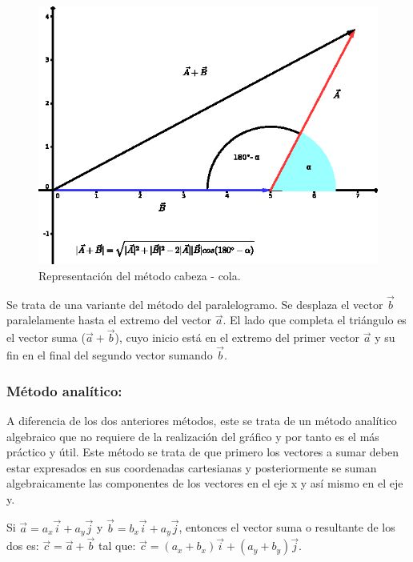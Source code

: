 \begin{figure}[H]
 \includegraphics[scale=1.1]{images/vector_seis.eps}
    \caption{\small{Representación del método cabeza - cola.}}
\end{figure}

Se trata de una variante del método del paralelogramo. Se desplaza el vector $\vec{b}$ paralelamente hasta el extremo 
del vector $\vec{a}$. El lado que completa el triángulo es el vector suma ($\vec{a} + \vec{b}$), cuyo inicio está en el 
extremo del primer vector $\vec{a}$ y su fin en el final del segundo vector sumando $\vec{b}$. 
    
\subsubsection{Método analítico:}     

A diferencia de los dos anteriores métodos, este se trata de un método analítico algebraico que no requiere de la 
realización del gráfico y por tanto es el más práctico y útil. Este método se trata de que primero los vectores a sumar 
deben estar expresados en sus coordenadas cartesianas y posteriormente se suman algebraicamente las componentes de los 
vectores en el eje x y así mismo en el eje y.

\begin{tcolorbox}
 Si $\vec{a} = a_x\vec{i}+a_y\vec{j}$ y $\vec{b} = b_x\vec{i}+a_y\vec{j}$, entonces el vector suma o resultante de los 
dos es: $\vec{c} =\vec{a}+\vec{b}$ tal que: $\vec{c} = (a_x + b_x)\vec{i} +(a_y+b_y)\vec{j}$. 
\end{tcolorbox}

